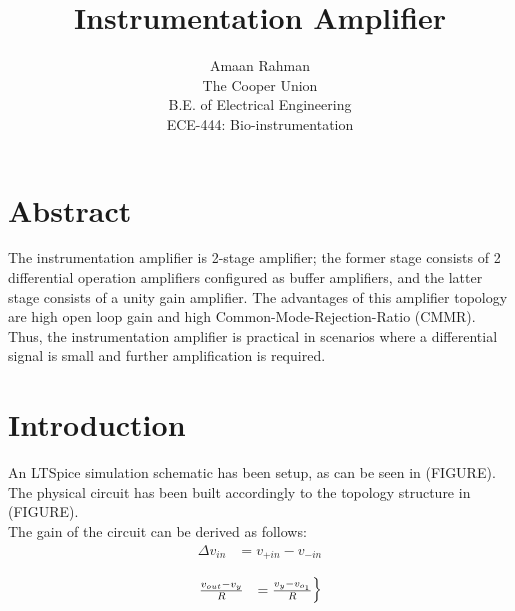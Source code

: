 \documentclass{article}
\title{Instrumentation Amplifier}
\author{Amaan Rahman \\
The Cooper Union \\
B.E. of Electrical Engineering \\
ECE-444: Bio-instrumentation}
\begin{document}
\maketitle
\section{Abstract}
The instrumentation amplifier is 2-stage amplifier; the former stage consists of 2 differential operation amplifiers configured as buffer amplifiers, and the latter stage consists of a unity gain amplifier. The advantages of this amplifier topology are high open loop gain and high Common-Mode-Rejection-Ratio (CMMR). Thus, the instrumentation amplifier is practical in scenarios where a differential signal is small and further amplification is required. 

\section{Introduction}
An LTSpice simulation schematic has been setup, as can be seen in (FIGURE). The physical circuit has been built accordingly to the topology structure in (FIGURE). \\

The gain of the circuit can be derived as follows:
\begin{equation*}
    \begin{aligned}
        \Delta v_{in} &= v_{+in} - v_{-in} \\
    \end{aligned}
\end{equation*}
\[
    \begin{rcases}
        \frac{v_{out} - v_y}{R} &= \frac{v_y - v_{o_1}}{R}
        
    \end{rcases}
\]
\end{document}
